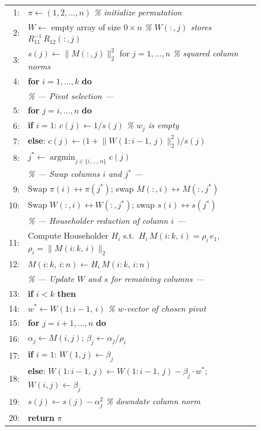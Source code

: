 \documentclass[11pt]{article}
\theoremstyle{definition}
\theoremstyle{remark}
\newcommand{\tnorm}[1]{\lVert #1 \rVert_2}
\begin{document}
\begin{figure}[ht]
\begin{mdframed}
\medskip\noindent
\begin{tabular}{@{}rp{}}
1: & $\pi \gets (1, 2, \ldots, n)$
     \hfill\textit{\% initialize permutation} \\
2: & $W \gets$ empty array of size $0 \times n$
     \hfill\textit{\% $W(:,j)$ stores $R_{11}^{-1}\, R_{12}(:,j)$} \\
3: & $s(j) \gets \tnorm{M(:,j)}^2$ for $j = 1, \ldots, n$
     \hfill\textit{\% squared column norms} \\[4pt]
4: & \textbf{for} $i = 1, \ldots, k$ \textbf{do} \\
   & \quad\textit{\% --- Pivot selection ---} \\
5: & \quad \textbf{for} $j = i, \ldots, n$ \textbf{do} \\
6: & \quad\quad \textbf{if} $i = 1$: \;
       $c(j) \gets 1 / s(j)$
       \hfill\textit{\% $w_j$ is empty} \\
7: & \quad\quad \textbf{else}: \;
       $c(j) \gets \bigl(1 + \tnorm{W(1{:}i{-}1,\,j)}^2\bigr) / s(j)$ \\
8: & \quad $j^* \gets \displaystyle\operatorname*{argmin}_{j \in \{i,\ldots,n\}} c(j)$ \\[4pt]
   & \quad\textit{\% --- Swap columns $i$ and $j^*$ ---} \\
9: & \quad Swap $\pi(i) \leftrightarrow \pi(j^*)$; \;
       swap $M(:,i) \leftrightarrow M(:,j^*)$ \\
10: & \quad Swap $W(:,i) \leftrightarrow W(:,j^*)$; \;
       swap $s(i) \leftrightarrow s(j^*)$ \\[4pt]
   & \quad\textit{\% --- Householder reduction of column $i$ ---} \\
11: & \quad Compute Householder $H_i$ s.t.\
       $H_i\, M(i{:}k,\,i) = \rho_i\, e_1$, \;
       $\rho_i = \tnorm{M(i{:}k,\,i)}$ \\
12: & \quad $M(i{:}k,\, i{:}n) \gets H_i\, M(i{:}k,\, i{:}n)$ \\[4pt]
   & \quad\textit{\% --- Update $W$ and $s$ for remaining columns ---} \\
13: & \quad \textbf{if} $i < k$ \textbf{then} \\
14: & \quad\quad $w^* \gets W(1{:}i{-}1,\, i)$
       \hfill\textit{\% $w$-vector of chosen pivot} \\
15: & \quad\quad \textbf{for} $j = i+1, \ldots, n$ \textbf{do} \\
16: & \quad\quad\quad $\alpha_j \gets M(i,j)$; \;\;
       $\beta_j \gets \alpha_j / \rho_i$ \\
17: & \quad\quad\quad \textbf{if} $i = 1$: \;
       $W(1,j) \gets \beta_j$ \\
18: & \quad\quad\quad \textbf{else}: \;
       $W(1{:}i{-}1,\, j) \gets W(1{:}i{-}1,\, j) - \beta_j \cdot w^*$; \;\;
       $W(i,j) \gets \beta_j$ \\
19: & \quad\quad\quad $s(j) \gets s(j) - \alpha_j^2$
       \hfill\textit{\% downdate column norm} \\
20: & \textbf{return} $\pi$
\end{tabular}
\end{mdframed}
\end{figure}
\end{document}
